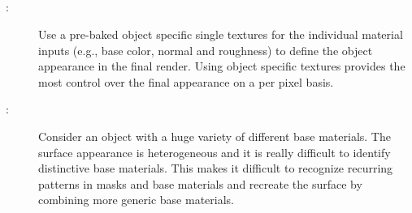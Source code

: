 \subsection{\patAlternativeBaked}\label{\patAlternativeBaked}
\begin{description}
	\item[\patIntent:]%
	Use a pre-baked object specific single textures for the individual material inputs (e.g., base color, normal and roughness) to define the object appearance in the final render. Using object specific textures provides the most control over the final appearance on a per pixel basis. 
	\item[\patMotivation:]%
	Consider an object with a huge variety of different base materials. The surface appearance is heterogeneous and it is really difficult to identify distinctive base materials. This makes it difficult to recognize recurring patterns in masks and base materials and recreate the surface by combining more generic base materials.
	

\end{description}
